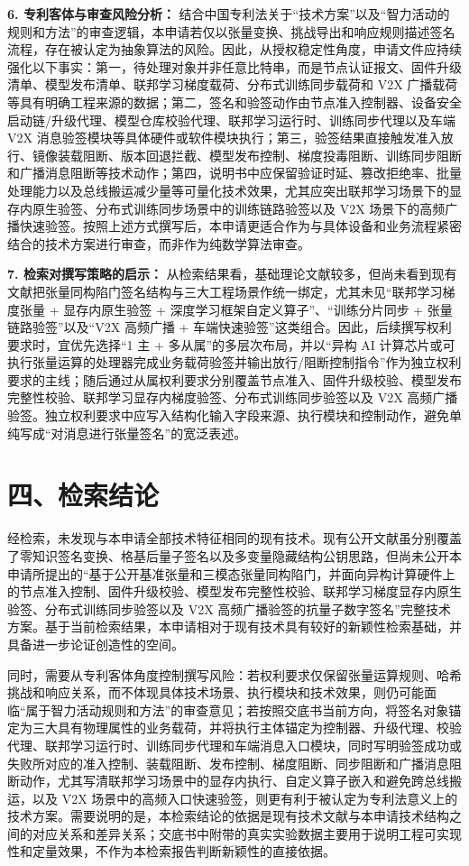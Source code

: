 \documentclass[12pt,a4paper]{article}
\begin{document}
\textbf{6. 专利客体与审查风险分析：}
结合中国专利法关于“技术方案”以及“智力活动的规则和方法”的审查逻辑，本申请若仅以张量变换、挑战导出和响应规则描述签名流程，存在被认定为抽象算法的风险。因此，从授权稳定性角度，申请文件应持续强化以下事实：第一，待处理对象并非任意比特串，而是节点认证报文、固件升级清单、模型发布清单、联邦学习梯度载荷、分布式训练同步载荷和 V2X 广播载荷等具有明确工程来源的数据；第二，签名和验签动作由节点准入控制器、设备安全启动链/升级代理、模型仓库校验代理、联邦学习运行时、训练同步代理以及车端 V2X 消息验签模块等具体硬件或软件模块执行；第三，验签结果直接触发准入放行、镜像装载阻断、版本回退拦截、模型发布控制、梯度投毒阻断、训练同步阻断和广播消息阻断等技术动作；第四，说明书中应保留验证时延、篡改拒绝率、批量处理能力以及总线搬运减少量等可量化技术效果，尤其应突出联邦学习场景下的显存内原生验签、分布式训练同步场景中的训练链路验签以及 V2X 场景下的高频广播快速验签。按照上述方式撰写后，本申请更适合作为与具体设备和业务流程紧密结合的技术方案进行审查，而非作为纯数学算法审查。

\textbf{7. 检索对撰写策略的启示：}
从检索结果看，基础理论文献较多，但尚未看到现有文献把张量同构陷门签名结构与三大工程场景作统一绑定，尤其未见“联邦学习梯度张量 + 显存内原生验签 + 深度学习框架自定义算子”、“训练分片同步 + 张量链路验签”以及“V2X 高频广播 + 车端快速验签”这类组合。因此，后续撰写权利要求时，宜优先选择“1 主 + 多从属”的多层次布局，并以“异构 AI 计算芯片或可执行张量运算的处理器完成业务载荷验签并输出放行/阻断控制指令”作为独立权利要求的主线；随后通过从属权利要求分别覆盖节点准入、固件升级校验、模型发布完整性校验、联邦学习显存内梯度验签、分布式训练同步验签以及 V2X 高频广播验签。独立权利要求中应写入结构化输入字段来源、执行模块和控制动作，避免单纯写成“对消息进行张量签名”的宽泛表述。

\section*{四、检索结论}

经检索，未发现与本申请全部技术特征相同的现有技术。现有公开文献虽分别覆盖了零知识签名变换、格基后量子签名以及多变量隐藏结构公钥思路，但尚未公开本申请所提出的“基于公开基准张量和三模态张量同构陷门，并面向异构计算硬件上的节点准入控制、固件升级校验、模型发布完整性校验、联邦学习梯度显存内原生验签、分布式训练同步验签以及 V2X 高频广播验签的抗量子数字签名”完整技术方案。基于当前检索结果，本申请相对于现有技术具有较好的新颖性检索基础，并具备进一步论证创造性的空间。

同时，需要从专利客体角度控制撰写风险：若权利要求仅保留张量运算规则、哈希挑战和响应关系，而不体现具体技术场景、执行模块和技术效果，则仍可能面临“属于智力活动规则和方法”的审查意见；若按照交底书当前方向，将签名对象锚定为三大具有物理属性的业务载荷，并将执行主体锚定为控制器、升级代理、校验代理、联邦学习运行时、训练同步代理和车端消息入口模块，同时写明验签成功或失败所对应的准入控制、装载阻断、发布控制、梯度阻断、同步阻断和广播消息阻断动作，尤其写清联邦学习场景中的显存内执行、自定义算子嵌入和避免跨总线搬运，以及 V2X 场景中的高频入口快速验签，则更有利于被认定为专利法意义上的技术方案。需要说明的是，本检索结论的依据是现有技术文献与本申请技术结构之间的对应关系和差异关系；交底书中附带的真实实验数据主要用于说明工程可实现性和定量效果，不作为本检索报告判断新颖性的直接依据。
\end{document}
